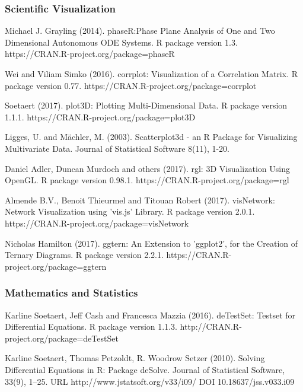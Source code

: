 \begin{thebibliography}{00}
	
\subsubsection{Scientific Visualization}
	
	Michael J. Grayling (2014). 
	\newblock phaseR:Phase Plane Analysis of One and Two Dimensional Autonomous ODE Systems. 
	\newblock R package version 1.3. https://CRAN.R-project.org/package=phaseR
	
	 Wei and Viliam Simko (2016).
	\newblock corrplot: Visualization of a Correlation Matrix. 
	\newblock R package version 0.77. https://CRAN.R-project.org/package=corrplot
	
	 Soetaert (2017). 
	\newblock plot3D: Plotting Multi-Dimensional Data. 
	\newblock R package version 1.1.1. https://CRAN.R-project.org/package=plot3D
	
	 Ligges, U. and Mächler, M. (2003).
	\newblock Scatterplot3d - an R Package for Visualizing Multivariate Data.
	\newblock Journal of Statistical Software 8(11), 1-20.
	
	Daniel Adler, Duncan Murdoch and others (2017). 
	\newblock rgl: 3D Visualization Using OpenGL. 
	\newblock R package version 0.98.1. https://CRAN.R-project.org/package=rgl
	
	 Almende B.V., Benoit Thieurmel and Titouan Robert (2017). visNetwork:
	\newblock Network Visualization using 'vis.js' Library. R package version 2.0.1.
	\newblock https://CRAN.R-project.org/package=visNetwork
	
	 Nicholas Hamilton (2017). 
	\newblock ggtern: An Extension to 'ggplot2', for the Creation of Ternary Diagrams. 
	\newblock R package version 2.2.1. https://CRAN.R-project.org/package=ggtern
	
\subsubsection{Mathematics and Statistics}
	
	 Karline Soetaert, Jeff Cash and Francesca Mazzia (2016). 
	\newblock deTestSet: Testset for Differential Equations. R package version 1.1.3.
	\newblock http://CRAN.R-project.org/package=deTestSet
	
	Karline Soetaert, Thomas Petzoldt, R. Woodrow Setzer (2010). 
	\newblock Solving Differential Equations in R: Package deSolve. 
	\newblock Journal of Statistical Software, 33(9), 1--25. URL http://www.jstatsoft.org/v33/i09/ DOI 10.18637/jss.v033.i09
	

\end{thebibliography}

